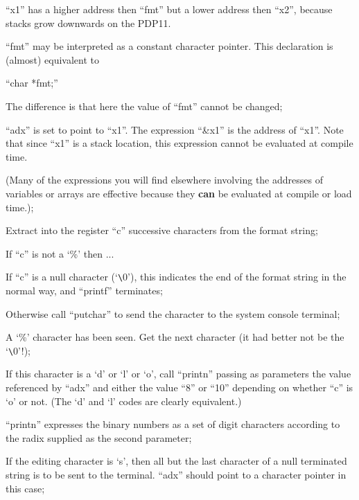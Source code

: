 ``x1'' has a higher address then ``fmt''
but a lower address then ``x2'', because
stacks grow downwards on the PDP11.

\bd
\item[2341:] ``fmt'' may be interpreted as a
 constant character pointer. This
 declaration is (almost)
 equivalent to

 ``char *fmt;''

The difference is that here the
value of ``fmt'' cannot be changed;

\item[2346:] ``adx'' is set to point to ``x1''.
 The expression ``\&x1'' is the
 address of ``x1''. Note that since
 ``x1'' is a stack location, this
 expression cannot be evaluated at
 compile time.

(Many of the expressions you will
find elsewhere involving the
addresses of variables or arrays
are effective because they {\bf can} be
evaluated at compile or load
time.);

\item[2348:] Extract into the register ``c''
 successive characters from the
 format string;

\item[2349:] If ``c'' is not a `\%' then ...

\item[2350:] If ``c'' is a null character
 (`\verb+\+0'), this indicates the end of
 the format string in the normal
 way, and ``printf'' terminates;

\item[2351:] Otherwise call ``putchar'' to send
 the character to the system console terminal;

\item[2353:] A `\%' character has been seen.
 Get the next character (it had
 better not be the `\verb+\+0'!);

\item[2354:] If this character is a `d' or `l'
 or `o', call ``printn'' passing as
 parameters the value referenced
 by ``adx'' and either the value ``8''
 or ``10'' depending on whether ``c''
 is `o' or not. (The `d' and `l'
 codes are clearly equivalent.)

``printn'' expresses the binary
numbers as a set of digit characters according to the radix 
supplied as the second parameter;

\item[2356:] If the editing character is `s',
 then all but the last character
 of a null terminated string is to
 be sent to the terminal. ``adx''
 should point to a character
 pointer in this case;

